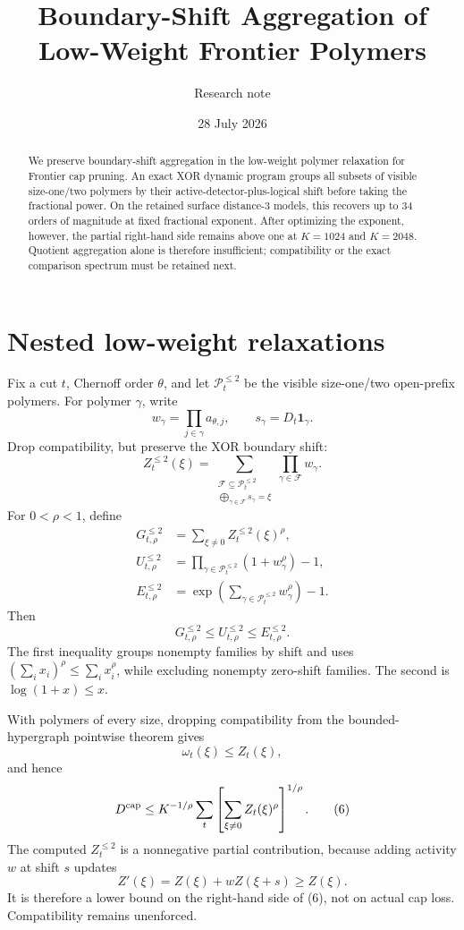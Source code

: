\documentclass[11pt]{article}
\title{Boundary-Shift Aggregation of Low-Weight Frontier Polymers}
\author{Research note}
\date{28 July 2026}
\begin{document}
\maketitle

\begin{abstract}
We preserve boundary-shift aggregation in the low-weight polymer relaxation
for Frontier cap pruning.  An exact XOR dynamic program groups all subsets of
visible size-one/two polymers by their active-detector-plus-logical shift
before taking the fractional power.  On the retained surface distance-3
models, this recovers up to 34 orders of magnitude at fixed fractional
exponent.  After optimizing the exponent, however, the partial right-hand
side remains above one at \(K=1024\) and \(K=2048\).  Quotient aggregation
alone is therefore insufficient; compatibility or the exact comparison
spectrum must be retained next.
\end{abstract}

\section{Nested low-weight relaxations}

Fix a cut \(t\), Chernoff order \(\theta\), and let
\(\mathcal P_t^{\le2}\) be the visible size-one/two open-prefix polymers.
For polymer \(\gamma\), write
\[
 w_\gamma=\prod_{j\in\gamma}a_{\theta,j},
 \qquad
 s_\gamma=D_t\mathbf1_\gamma.
\tag{1}
\]
Drop compatibility, but preserve the XOR boundary shift:
\[
 Z_t^{\le2}(\xi)
 =
 \sum_{\substack{
 \mathcal F\subseteq\mathcal P_t^{\le2}\\
 \bigoplus_{\gamma\in\mathcal F}s_\gamma=\xi}}
 \prod_{\gamma\in\mathcal F}w_\gamma.
\tag{2}
\]
For \(0<\rho<1\), define
\[
\begin{aligned}
 G_{t,\rho}^{\le2}
 &=
 \sum_{\xi\ne0}Z_t^{\le2}(\xi)^\rho,\\
 U_{t,\rho}^{\le2}
 &=
 \prod_{\gamma\in\mathcal P_t^{\le2}}(1+w_\gamma^\rho)-1,\\
 E_{t,\rho}^{\le2}
 &=
 \exp\left(\sum_{\gamma\in\mathcal P_t^{\le2}}w_\gamma^\rho\right)-1.
\end{aligned}
\tag{3}
\]
Then
\[
\boxed{
 G_{t,\rho}^{\le2}
 \le U_{t,\rho}^{\le2}
 \le E_{t,\rho}^{\le2}.}
\tag{4}
\]
The first inequality groups nonempty families by shift and uses
\((\sum_i x_i)^\rho\le\sum_i x_i^\rho\), while excluding nonempty
zero-shift families.  The second is \(\log(1+x)\le x\).

With polymers of every size, dropping compatibility from the
bounded-hypergraph pointwise theorem gives
\[
 \omega_t(\xi)\le Z_t(\xi),
\tag{5}
\]
and hence
\[
 D^{\rm cap}
 \le K^{-1/\rho}\sum_t
 \left[\sum_{\xi\ne0}Z_t(\xi)^\rho\right]^{1/\rho}.
\tag{6}
\]
The computed \(Z_t^{\le2}\) is a nonnegative partial contribution, because
adding activity \(w\) at shift \(s\) updates
\[
 Z'(\xi)=Z(\xi)+wZ(\xi+s)\ge Z(\xi).
\tag{7}
\]
It is therefore a lower bound on the right-hand side of (6), not on actual
cap loss.  Compatibility remains unenforced.
\end{document}
